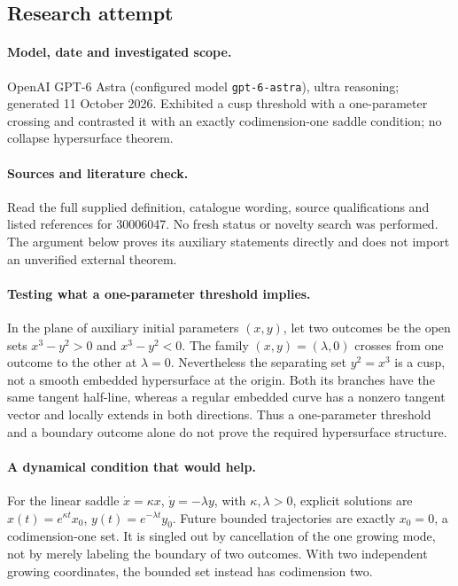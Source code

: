 \documentclass[11pt]{article}
\begin{document}
\subsection{Research attempt}
\paragraph{Model, date and investigated scope.}
OpenAI GPT-6 Astra (configured model \texttt{gpt-6-astra}), ultra reasoning; generated 11 October 2026. Exhibited a cusp threshold with a one-parameter crossing and contrasted it with an exactly codimension-one saddle condition; no collapse hypersurface theorem.

\paragraph{Sources and literature check.}
Read the full supplied definition, catalogue wording, source qualifications and listed references for 30006047. No fresh status or novelty search was performed. The argument below proves its auxiliary statements directly and does not import an unverified external theorem.

\paragraph{Testing what a one-parameter threshold implies.} In the plane of auxiliary initial parameters \((x,y)\), let two outcomes be the open sets \(x^3-y^2>0\) and \(x^3-y^2<0\). The family \((x,y)=(\lambda,0)\) crosses from one outcome to the other at \(\lambda=0\). Nevertheless the separating set \(y^2=x^3\) is a cusp, not a smooth embedded hypersurface at the origin. Both its branches have the same tangent half-line, whereas a regular embedded curve has a nonzero tangent vector and locally extends in both directions. Thus a one-parameter threshold and a boundary outcome alone do not prove the required hypersurface structure.
\paragraph{A dynamical condition that would help.} For the linear saddle \(\dot x=\kappa x\), \(\dot y=-\lambda y\), with \(\kappa,\lambda>0\), explicit solutions are \(x(t)=e^{\kappa t}x_0\), \(y(t)=e^{-\lambda t}y_0\). Future bounded trajectories are exactly \(x_0=0\), a codimension-one set. It is singled out by cancellation of the one growing mode, not by merely labeling the boundary of two outcomes. With two independent growing coordinates, the bounded set instead has codimension two.
\end{document}

